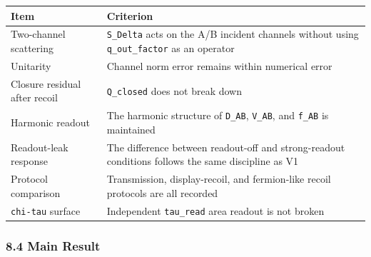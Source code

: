 \documentclass[
]{article}
\newcounter{none} %
\begin{document}
{\def\LTcaptype{none} %
\begin{longtable}[]{@{}
  >{\raggedright\arraybackslash}p{}
  >{\raggedright\arraybackslash}p{}@{}}
\toprule\noalign{}
\begin{minipage}[b]{\linewidth}\raggedright
Item
\end{minipage} & \begin{minipage}[b]{\linewidth}\raggedright
Criterion
\end{minipage} \\
\midrule\noalign{}
\endhead
\bottomrule\noalign{}
\endlastfoot
Two-channel scattering & \texttt{S\_Delta} acts on the A/B incident
channels without using \texttt{q\_out\_factor} as an operator \\
Unitarity & Channel norm error remains within numerical error \\
Closure residual after recoil & \texttt{Q\_closed} does not break
down \\
Harmonic readout & The harmonic structure of \texttt{D\_AB},
\texttt{V\_AB}, and \texttt{f\_AB} is maintained \\
Readout-leak response & The difference between readout-off and
strong-readout conditions follows the same discipline as V1 \\
Protocol comparison & Transmission, display-recoil, and fermion-like
recoil protocols are all recorded \\
\texttt{chi-tau} surface & Independent \texttt{tau\_read} area readout
is not broken \\
\end{longtable}
}

\subsubsection{8.4 Main Result}\label{main-result-6}
\end{document}
